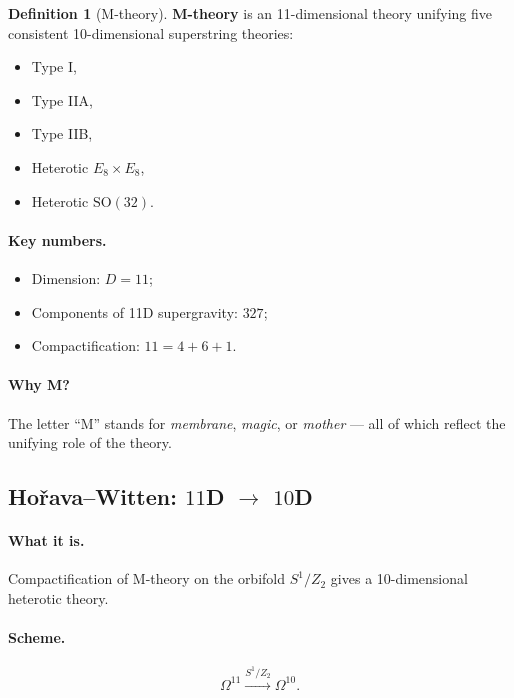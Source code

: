 \documentclass[11pt,a4paper]{article}
\newcommand{\SO}{\mathrm{SO}}
\newcommand{\Omt}{\Omega^{10}}
\newcommand{\Ome}{\Omega^{11}}
\theoremstyle{definition}
\newtheorem{definition}[theorem]{Definition}
\begin{document}
\begin{definition}[M-theory]
\label{def:mtheory}
\textbf{M-theory} is an 11-dimensional theory unifying five 
consistent 10-dimensional superstring theories:
\begin{itemize}
    \item Type I,
    \item Type IIA,
    \item Type IIB,
    \item Heterotic $E_8 \times E_8$,
    \item Heterotic $\SO(32)$.
\end{itemize}
\end{definition}

\paragraph{Key numbers.}
\begin{itemize}
    \item Dimension: $D = 11$;
    \item Components of 11D supergravity: $327$;
    \item Compactification: $11 = 4 + 6 + 1$.
\end{itemize}

\paragraph{Why M?}
The letter ``M'' stands for \emph{membrane}, \emph{magic}, or 
\emph{mother} — all of which reflect the unifying role of the theory.

\subsection{Hořava--Witten: $11$D $\to$ $10$D}
\label{subsec:horava-witten}

\paragraph{What it is.}
Compactification of M-theory on the orbifold $S^1/Z_2$ gives 
a 10-dimensional heterotic theory.

\paragraph{Scheme.}
\begin{equation}
    \Ome \xrightarrow{S^1/Z_2} \Omt.
\end{equation}
\end{document}
